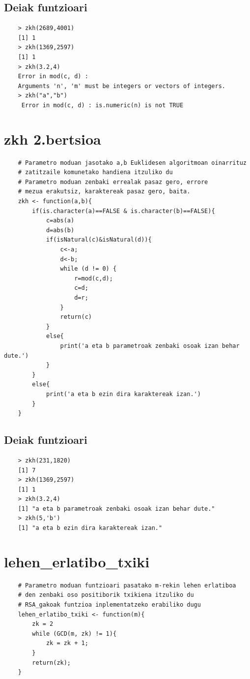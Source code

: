 \documentclass[12pt]{basque-book}
\begin{document}
\newpage
\subsection{Deiak funtzioari}
\begin{verbatim}
    > zkh(2689,4001)
    [1] 1
    > zkh(1369,2597)
    [1] 1
    > zkh(3.2,4)
    Error in mod(c, d) : 
    Arguments 'n', 'm' must be integers or vectors of integers. 
    > zkh("a","b")
     Error in mod(c, d) : is.numeric(n) is not TRUE 
\end{verbatim}

\newpage

\section{zkh 2.bertsioa}
\begin{verbatim}
    # Parametro moduan jasotako a,b Euklidesen algoritmoan oinarrituz
    # zatitzaile komunetako handiena itzuliko du
    # Parametro moduan zenbaki errealak pasaz gero, errore
    # mezua erakutsiz, karaktereak pasaz gero, baita.
    zkh <- function(a,b){ 
        if(is.character(a)==FALSE & is.character(b)==FALSE){
            c=abs(a)
            d=abs(b)
            if(isNatural(c)&isNatural(d)){
                c<-a;
                d<-b;
                while (d != 0) {
                    r=mod(c,d);
                    c=d;
                    d=r;
                }
                return(c)
            }
            else{
                print('a eta b parametroak zenbaki osoak izan behar dute.')
            }
        }
        else{  
            print('a eta b ezin dira karaktereak izan.')
        }
    }
\end{verbatim}

\newpage

\subsection{Deiak funtzioari}
\begin{verbatim}
    > zkh(231,1820)
    [1] 7
    > zkh(1369,2597)
    [1] 1
    > zkh(3.2,4)
    [1] "a eta b parametroak zenbaki osoak izan behar dute." 
    > zkh(5,'b')
    [1] "a eta b ezin dira karaktereak izan."
\end{verbatim}

\newpage
\section{lehen\_erlatibo\_txiki}
\begin{verbatim}
    # Parametro moduan funtzioari pasatako m-rekin lehen erlatiboa 
    # den zenbaki oso positiborik txikiena itzuliko du
    # RSA_gakoak funtzioa inplementatzeko erabiliko dugu
    lehen_erlatibo_txiki <- function(m){
        zk = 2
        while (GCD(m, zk) != 1){
            zk = zk + 1;
        }
        return(zk);
    }
\end{verbatim}
\end{document}
